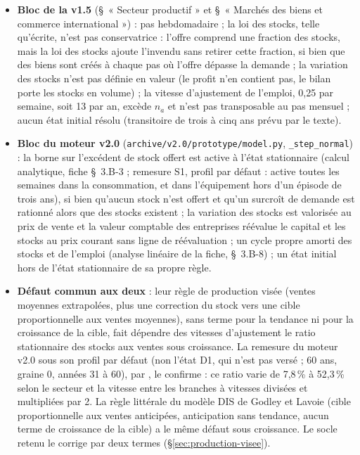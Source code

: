 \documentclass[11pt,a4paper]{article}
\newcommand{\code}[1]{\texttt{\detokenize{#1}}}
\begin{document}
\begin{itemize}
\item \textbf{Bloc de la v1.5} (\S~« Secteur productif » et \S~« Marchés des biens et commerce international ») : pas hebdomadaire ; la loi des stocks, telle qu'écrite, n'est pas conservatrice : l'offre comprend une fraction des stocks, mais la loi des stocks ajoute l'invendu sans retirer cette fraction, si bien que des biens sont créés à chaque pas où l'offre dépasse la demande ; la variation des stocks n'est pas définie en valeur (le profit n'en contient pas, le bilan porte les stocks en volume) ; la vitesse d'ajustement de l'emploi, 0,25 par semaine, soit 13 par an, excède $n_a$ et n'est pas transposable au pas mensuel ; aucun état initial résolu (transitoire de trois à cinq ans prévu par le texte).
\item \textbf{Bloc du moteur v2.0} (\texttt{archive/v2.0/prototype/model.py}, \texttt{\_step\_normal}) : la borne sur l'excédent de stock offert est active à l'état stationnaire (calcul analytique, fiche \S~3.B-3 ; remesure S1, profil par défaut : active toutes les semaines dans la consommation, et dans l'équipement hors d'un épisode de trois ans), si bien qu'aucun stock n'est offert et qu'un surcroît de demande est rationné alors que des stocks existent ; la variation des stocks est valorisée au prix de vente et la valeur comptable des entreprises réévalue le capital et les stocks au prix courant sans ligne de réévaluation ; un cycle propre amorti des stocks et de l'emploi (analyse linéaire de la fiche, \S~3.B-8) ; un état initial hors de l'état stationnaire de sa propre règle.
\item \textbf{Défaut commun aux deux} : leur règle de production visée (ventes moyennes extrapolées, plus une correction du stock vers une cible proportionnelle aux ventes moyennes), sans terme pour la tendance ni pour la croissance de la cible, fait dépendre des vitesses d'ajustement le ratio stationnaire des stocks aux ventes sous croissance. La remesure du moteur v2.0 sous son profil par défaut (non l'état D1, qui n'est pas versé ; 60 ans, graine 0, années 31 à 60), par \code{outils/remesurer_v2_production.py}, le confirme : ce ratio varie de 7,8\,\% à 52,3\,\% selon le secteur et la vitesse entre les branches à vitesses divisées et multipliées par 2. La règle littérale du modèle DIS de Godley et Lavoie (cible proportionnelle aux ventes anticipées, anticipation sans tendance, aucun terme de croissance de la cible) a le même défaut sous croissance. Le socle retenu le corrige par deux termes (\S\ref{sec:production-visee}).

\end{itemize}
\end{document}
